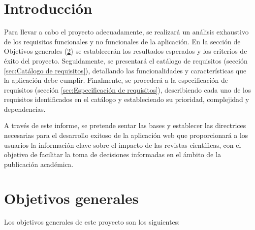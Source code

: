 
\section{Introducción}

Para llevar a cabo el proyecto adecuadamente, se realizará un análisis exhaustivo de los requisitos funcionales y no funcionales de la aplicación. En la sección de Objetivos generales (\ref{sec:Objetivos generales}) se establecerán los resultados esperados y los criterios de éxito del proyecto. Seguidamente, se presentará el catálogo de requisitos (sección \ref{sec:Catálogo de requisitos}), detallando las funcionalidades y características que la aplicación debe cumplir. Finalmente, se procederá a la especificación de requisitos (sección \ref{sec:Especificación de requisitos}), describiendo cada uno de los requisitos identificados en el catálogo y estableciendo su prioridad, complejidad y dependencias.

A través de este informe, se pretende sentar las bases y establecer las directrices necesarias para el desarrollo exitoso de la aplicación web que proporcionará a los usuarios la información clave sobre el impacto de las revistas científicas, con el objetivo de facilitar la toma de decisiones informadas en el ámbito de la publicación académica.

\section{Objetivos generales}
\label{sec:Objetivos generales}

Los objetivos generales de este proyecto son los siguientes:

